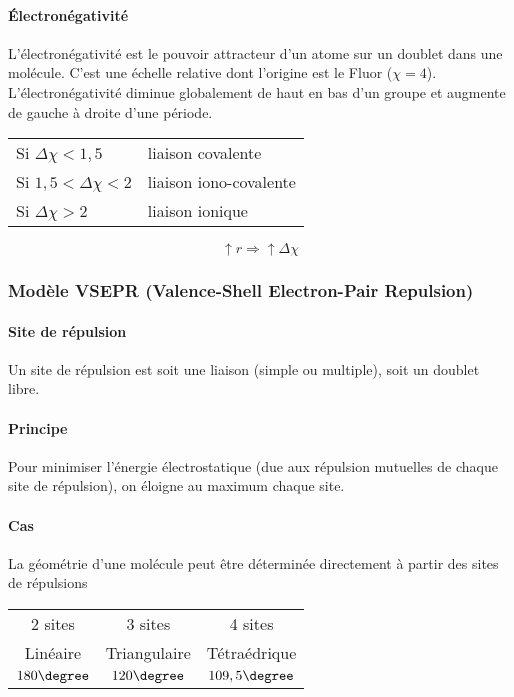 \paragraph{\'Electronégativité}
L'électronégativité est le pouvoir attracteur d'un atome sur un doublet dans une molécule.
C'est une échelle relative dont l'origine est le Fluor ($\chi = 4$). L'électronégativité
diminue globalement de haut en bas d'un groupe et augmente de gauche à droite d'une période.
\begin{center}
  \begin{tabular}{ll}
    Si $\Delta \chi < 1,5$ & liaison covalente\\
    Si $1,5 < \Delta \chi < 2$ & liaison iono-covalente\\
    Si $\Delta \chi > 2$ & liaison ionique
  \end{tabular}
\end{center}
$$\uparrow r \Rightarrow \uparrow \Delta \chi$$

\subsubsection{Modèle VSEPR (Valence-Shell Electron-Pair Repulsion)}
\paragraph{Site de répulsion}
Un site de répulsion est soit une liaison (simple ou multiple),
soit un doublet libre.

\paragraph{Principe}
Pour minimiser l'énergie électrostatique (due aux répulsion mutuelles de chaque site de répulsion),
on éloigne au maximum chaque site.

\paragraph{Cas}
La géométrie d'une molécule peut être déterminée directement à partir des sites de répulsions
\begin{center}
  \begin{tabular}{ccc}
    2 sites & 3 sites & 4 sites\\
    Linéaire & Triangulaire & Tétraédrique\\
    $180\degree$ & $120\degree$ & $109,5\degree$\\
  \end{tabular}
\end{center}

